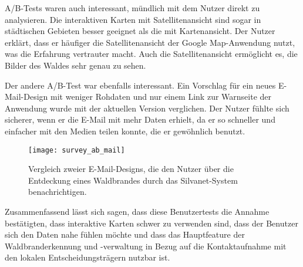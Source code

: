 A/B-Tests waren auch interessant, mündlich mit dem Nutzer direkt zu analysieren.
Die interaktiven Karten mit Satellitenansicht sind sogar in städtischen Gebieten besser geeignet als die mit Kartenansicht.
Der Nutzer erklärt, dass er häufiger die Satellitenansicht der Google Map-Anwendung nutzt, was die Erfahrung vertrauter macht.
Auch die Satellitenansicht ermöglicht es, die Bilder des Waldes sehr genau zu sehen.

Der andere A/B-Test war ebenfalls interessant. Ein Vorschlag für ein neues E-Mail-Design mit weniger Rohdaten und nur einem Link zur Warnseite der Anwendung wurde mit der aktuellen Version verglichen.
Der Nutzer fühlte sich sicherer, wenn er die E-Mail mit mehr Daten erhielt, da er so schneller und einfacher mit den Medien teilen konnte, die er gewöhnlich benutzt.

\begin{figure}[H]
  \centering
  \texttt{[image: survey\_ab\_mail]}
  \caption{Vergleich zweier E-Mail-Designs, die den Nutzer über die Entdeckung eines Waldbrandes durch das Silvanet-System benachrichtigen.}
  \label{fig:survey_ab_mail}
\end{figure}

Zusammenfassend lässt sich sagen, dass diese Benutzertests die Annahme bestätigten, dass interaktive Karten schwer zu verwenden sind, dass der Benutzer sich den Daten nahe fühlen möchte und dass das Hauptfeature der Waldbranderkennung und -verwaltung in Bezug auf die Kontaktaufnahme mit den lokalen Entscheidungsträgern nutzbar ist.

